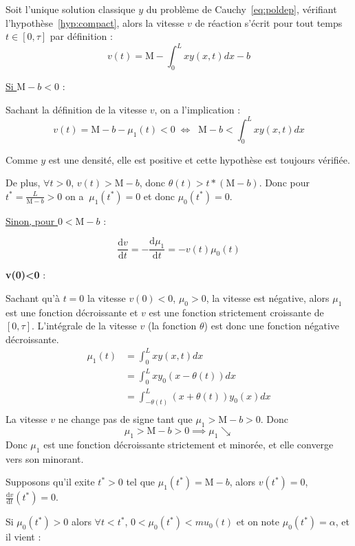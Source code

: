 \documentclass[a4paper]{article}
\newcommand{\mass}{\mathrm{M}}
\newcommand{\dep}{b}
\begin{document}
\begin{preuve}
	Soit l'unique solution classique $y$ du problème de Cauchy~\eqref{eq:poldep}, 
	vérifiant l'hypothèse~\eqref{hyp:compact},
	alors la vitesse $v$ de réaction s'écrit pour tout temps $t \in [0,\tau]$ par définition :
	\[v(t) = \mass -\int_0^L x y(x,t)dx -\dep\]

	\vspace{0.5cm}
	\underline{Si $\mass-\dep < 0 $} :
	
 	Sachant la définition de la vitesse $v$, on a l'implication :
 	\[ v(t) = \mass -\dep - \mu_1(t) <0 \; \iff \; \; \mass-\dep < \int_0^L x y(x,t)dx  \]
	
	Comme $y$ est une densité, elle est positive et cette hypothèse est toujours vérifiée.
	
	De plus, $\forall t>0$, $v(t)> \mass-\dep$, donc $\theta (t)>t*(\mass-\dep)$.
	Donc pour $t^* = \frac{L}{\mass-\dep}>0$ on a $\ \mu_1(t^*) = 0$ et donc $\mu_0(t^*) =0$.
	
	
	\vspace{0.5cm}
	\underline{Sinon, pour $0<\mass-\dep$} :
	
	\[ \frac{\mathrm{d} v }{\mathrm{d}t} =  - \frac{\mathrm{d} \mu_1 }{\mathrm{d}t} = - v(t) \mu_0(t) \]
	
	\textbf{v(0)<0} :
	
	Sachant qu'à $t=0$ la vitesse $v(0)<0$, $\mu_0 >0$, la vitesse est négative, 
	alors $\mu_1$ est une fonction décroissante et $v$ est une fonction strictement croissante de $[0,\tau]$.
	L'intégrale de la vitesse $v$ (la fonction $\theta$) est donc une fonction négative décroissante.
	\[ 
	\begin{split}
		\mu_1(t) & = \int_0^L x y(x,t)dx \\
		      & = \int_0^L x y_0(x-\theta(t)) dx \\
		      & = \int_{-\theta(t)}^{L} (x+\theta(t)) y_0(x) dx \\
	\end{split}
	\]
	La vitesse $v$ ne change pas de signe tant que $\mu_1 > \mass- \dep >0$. 
	Donc
	\[ \mu_1 > \mass- \dep >0 \implies \mu_1 \searrow \]
    Donc $\mu_1$ est une fonction décroissante strictement et minorée, 
	et elle converge vers son minorant.
	
	Supposons qu'il exite $t^*>0$ tel que $\mu_1(t^*)= \mass -\dep $, 
	alors $v(t^*)=0$, $\frac{\mathrm{d} v }{\mathrm{d}t} (t^*)= 0$.
	
	Si $\mu_0(t^*)>0$ alors $\forall t<t^*$, $0<\mu_0(t^*)<mu_0(t)$ et on note $ \mu_0(t^*)= \alpha$, et il vient :
	

\end{preuve}
\end{document}
